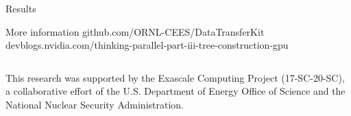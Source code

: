 \documentclass[final,hyperref={pdfpagelabels=false}]{beamer}
\begin{document}
\begin{frame}[t,fragile]
\begin{columns}[t]
\begin{column}{.480\textwidth}
\begin{block}{\centering Results}

\end{block}

\begin{block}{\centering More information}
  github.com/ORNL-CEES/DataTransferKit
  devblogs.nvidia.com/thinking-parallel-part-iii-tree-construction-gpu
\end{block}

\end{column}

\begin{column}{.015\textwidth}\end{column}

\end{columns}

\vfill

\begin{center}
\footnotesize
This research was supported by the Exascale Computing Project (17-SC-20-SC), a
collaborative effort of the U.S. Department of Energy Office of Science and the
National Nuclear Security Administration.


\end{center}
\end{frame}
\end{document}
